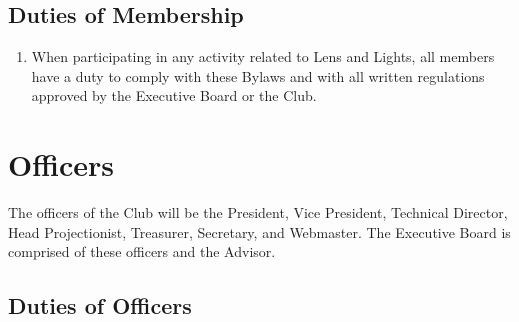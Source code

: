 \documentclass[12pt,letterpaper,oneside]{book}
\begin{document}
\section{Duties of Membership}

\begin{enumerate}

    \item \label{itm:dutiesofmembership} When participating in any activity related to Lens and Lights, all members have a duty to comply with these Bylaws and with all written regulations approved by the Executive Board or the Club.
    
\end{enumerate}

\chapter{Officers}

The officers of the Club will be the President, Vice President, Technical
Director, Head Projectionist, Treasurer, Secretary, and Webmaster. The Executive Board is comprised of these officers and the Advisor.

\section{Duties of Officers}
\end{document}
